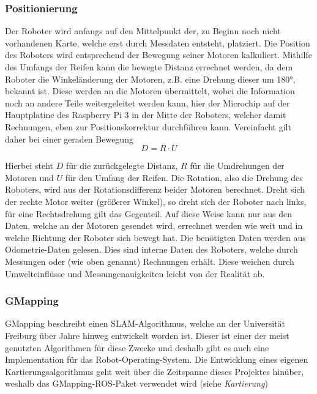 {{		\subsubsection{Positionierung}
		{
			Der Roboter wird anfangs auf den Mittelpunkt der, zu Beginn noch nicht vorhandenen Karte, welche erst durch Messdaten entsteht, platziert. Die Position des Roboters wird entsprechend der Bewegung seiner Motoren kalkuliert. Mithilfe des Umfangs der Reifen kann die bewegte Distanz errechnet werden, da dem Roboter die Winkeländerung der Motoren, z.B. eine Drehung dieser um 180°, bekannt ist. Diese werden an die Motoren übermittelt, wobei die Information noch an andere Teile weitergeleitet werden kann, hier der Microchip auf der Hauptplatine des Raspberry Pi 3 in der Mitte der Roboters, welcher damit Rechnungen, eben zur Positionskorrektur durchführen kann. Vereinfacht gilt daher bei einer geraden Bewegung
			\begin{equation}
				D = R \cdot U
			\end{equation} 
			
			Hierbei steht $D$ für die zurückgelegte Distanz, $R$ für die Umdrehungen der Motoren und $U$ für den Umfang der Reifen. Die Rotation, also die Drehung des Roboters, wird aus der Rotationsdifferenz beider Motoren berechnet. Dreht sich der rechte Motor weiter (größerer Winkel), so dreht sich der Roboter nach links, für eine Rechtsdrehung gilt das Gegenteil.
			Auf diese Weise kann nur aus den Daten, welche an der Motoren gesendet wird, errechnet werden wie weit und in welche Richtung der Roboter sich bewegt hat.
			Die benötigten Daten werden aus Odometrie-Daten gelesen. Dies sind interne Daten des Roboters, welche durch Messungen oder (wie oben genannt) Rechnungen erhält. Diese weichen durch Umwelteinflüsse und Messungenauigkeiten leicht von der Realität ab.
			
			
		\subsubsection{GMapping}
		{
			GMapping beschreibt einen SLAM-Algorithmus, welche an der Universität Freiburg über Jahre hinweg entwickelt worden ist. Dieser ist einer der  meist genutzten Algorithmen für diese Zwecke und deshalb gibt es auch eine Implementation für das Robot-Operating-System. Die Entwicklung eines eigenen Kartierungsalgorithmus geht weit über die Zeitspanne dieses Projektes hinüber, weshalb das GMapping-ROS-Paket verwendet wird (siehe \textit{Kartierung}) %
			
}}}}
